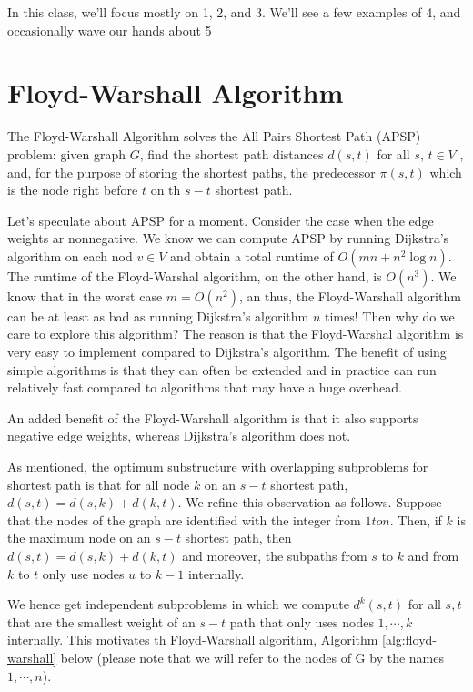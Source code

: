 \documentclass [12pt]{article}
\theoremstyle{definition}
\begin{document}
In this class, we'll focus mostly on 1, 2, and 3. We'll see a few examples of 4, and occasionally wave our hands about 5

\section{Floyd-Warshall Algorithm} 

The Floyd-Warshall Algorithm solves the All Pairs Shortest Path (APSP) problem: given  graph $G$, find the shortest path distances $d(s, t)$ for all $s$, $t \in V$ , and, for the purpose of storing the shortest paths, the predecessor $\pi(s, t)$ which is the node right before $t$ on th $s-t$ shortest path.

Let's speculate about APSP for a moment. Consider the case when the edge weights ar nonnegative. We know we can compute APSP by running Dijkstra's algorithm on each nod $v \in V$ and obtain a total runtime of $O(mn +  n^2 \log n)$. The runtime of the Floyd-Warshal algorithm, on the other hand, is $O(n^3)$. We know that in the worst case $m = O(n^2)$, an thus, the Floyd-Warshall algorithm can be at least as bad as running Dijkstra's algorithm  $n$ times! Then why do we care to explore this algorithm? The reason is that the Floyd-Warshal algorithm is very easy to implement compared to Dijkstra's algorithm. The benefit of using simple algorithms is that they can often be extended and in practice can run relatively fast compared to algorithms that may have a huge overhead.

An added benefit of the Floyd-Warshall algorithm is that it also supports negative edge weights, whereas Dijkstra's algorithm does not. 

As mentioned, the optimum substructure with overlapping subproblems for shortest path is that for all node $k$ on an $s-t$ shortest path, $d(s, t) = d(s, k) + d(k, t)$. We refine this observation as follows. Suppose that the nodes of the graph are identified with the integer from $1 to n$. Then, if $k$ is the maximum node on an $s-t$ shortest path, then $d(s, t) =  d(s, k) + d(k, t)$ and moreover, the subpaths from $s$ to $k$ and from $k$ to $t$ only use nodes $u$ to $k - 1$ internally.

We hence get independent subproblems in which we compute $d^{k}(s, t)$ for all $s, t$ that are the smallest weight of an $s-t$ path that only uses nodes $1, \cdots , k$ internally. This motivates th Floyd-Warshall algorithm, Algorithm \ref{alg:floyd-warshall} below (please note that we will refer to the nodes of G by the names $1, \cdots , n$).
\end{document}

